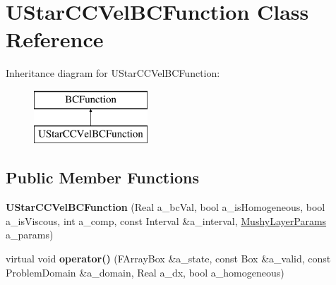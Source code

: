 \hypertarget{class_u_star_c_c_vel_b_c_function}{\section{U\-Star\-C\-C\-Vel\-B\-C\-Function Class Reference}
\label{class_u_star_c_c_vel_b_c_function}
}
Inheritance diagram for U\-Star\-C\-C\-Vel\-B\-C\-Function\-:\begin{figure}[H]
\begin{center}
\leavevmode
\includegraphics[height=2.000000cm]{class_u_star_c_c_vel_b_c_function}
\end{center}
\end{figure}
\subsection*{Public Member Functions}
\begin{DoxyCompactItemize}
\item 
\hypertarget{class_u_star_c_c_vel_b_c_function_a6c2870b23f7b23e11aea31d3240cdcad}{{\bfseries U\-Star\-C\-C\-Vel\-B\-C\-Function} (Real a\-\_\-bc\-Val, bool a\-\_\-is\-Homogeneous, bool a\-\_\-is\-Viscous, int a\-\_\-comp, const Interval \&a\-\_\-interval, \hyperlink{class_mushy_layer_params}{Mushy\-Layer\-Params} a\-\_\-params)}\label{class_u_star_c_c_vel_b_c_function_a6c2870b23f7b23e11aea31d3240cdcad}

\item 
\hypertarget{class_u_star_c_c_vel_b_c_function_a6a9e82f67ea5b2b2c4f85d02ed0320a0}{virtual void {\bfseries operator()} (F\-Array\-Box \&a\-\_\-state, const Box \&a\-\_\-valid, const Problem\-Domain \&a\-\_\-domain, Real a\-\_\-dx, bool a\-\_\-homogeneous)}\label{class_u_star_c_c_vel_b_c_function_a6a9e82f67ea5b2b2c4f85d02ed0320a0}

\end{DoxyCompactItemize}

